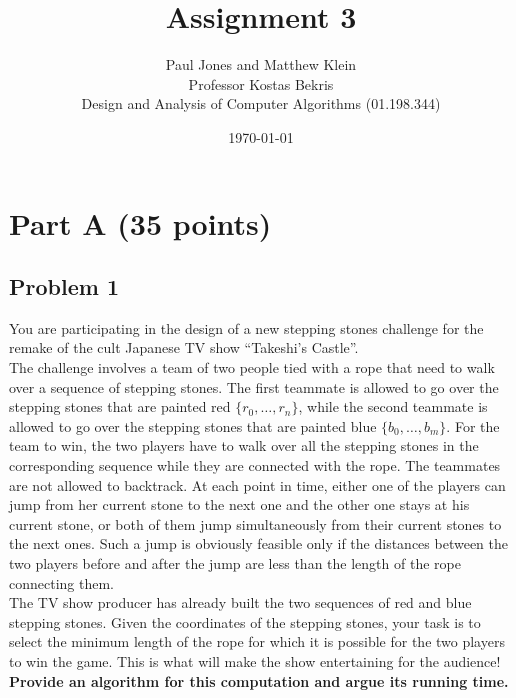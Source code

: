 \documentclass[11pt]{article}
\title{Assignment 3}
\author{Paul Jones and Matthew Klein \\
		Professor Kostas Bekris\\
		Design and Analysis of Computer Algorithms (01.198.344)}
\date{\today}
\begin{document}
\pagebreak

\section*{Part A (35 points)}

\subsection*{Problem 1} You are participating in the design of a
new stepping stones challenge for the remake of the cult Japanese TV
show ``Takeshi's Castle''.\\

\noindent The challenge involves a team of two people tied with a rope
that need to walk over a sequence of stepping stones. The first
teammate is allowed to go over the stepping stones that are painted
red $\{r_0, \ldots, r_n\}$, while the second teammate is allowed to go
over the stepping stones that are painted blue $\{b_0, \ldots,
b_m\}$. For the team to win, the two players have to walk over all the
stepping stones in the corresponding sequence while they are connected
with the rope. The teammates are not allowed to backtrack. At each
point in time, either one of the players can jump from her current
stone to the next one and the other one stays at his current stone, or
both of them jump simultaneously from their current stones to the next
ones. Such a jump is obviously feasible only if the distances between
the two players before and after the jump are less than the length of
the rope connecting them.\\

\noindent The TV show producer has already built the two sequences of
red and blue stepping stones. Given the coordinates of the stepping
stones, your task is to select the minimum length of the rope for
which it is possible for the two players to win the game. This is what
will make the show entertaining for the audience!\\

\noindent \textbf{Provide an algorithm for this computation and argue its
running time.}
\end{document}
